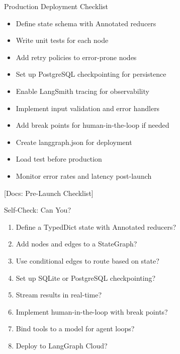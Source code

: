 \documentclass[aspectratio=169,11pt]{beamer}
\newcommand{\docref}[1]{{\scriptsize\color{docgray}[Docs: #1]}}
\begin{document}
\begin{frame}{Production Deployment Checklist}
\setlength{\itemsep}{1pt}
\begin{itemize}
\item Define state schema with Annotated reducers
\item Write unit tests for each node
\item Add retry policies to error-prone nodes
\item Set up PostgreSQL checkpointing for persistence
\item Enable LangSmith tracing for observability
\item Implement input validation and error handlers
\item Add break points for human-in-the-loop if needed
\item Create langgraph.json for deployment
\item Load test before production
\item Monitor error rates and latency post-launch
\end{itemize}
\vspace{0.1cm}
\docref{Pre-Launch Checklist}
\end{frame}

\begin{frame}{Self-Check: Can You?}
\setlength{\itemsep}{2pt}
\begin{enumerate}
\item Define a TypedDict state with Annotated reducers?
\item Add nodes and edges to a StateGraph?
\item Use conditional edges to route based on state?
\item Set up SQLite or PostgreSQL checkpointing?
\item Stream results in real-time?
\item Implement human-in-the-loop with break points?
\item Bind tools to a model for agent loops?
\item Deploy to LangGraph Cloud?
\end{enumerate}
\end{frame}
\end{document}
